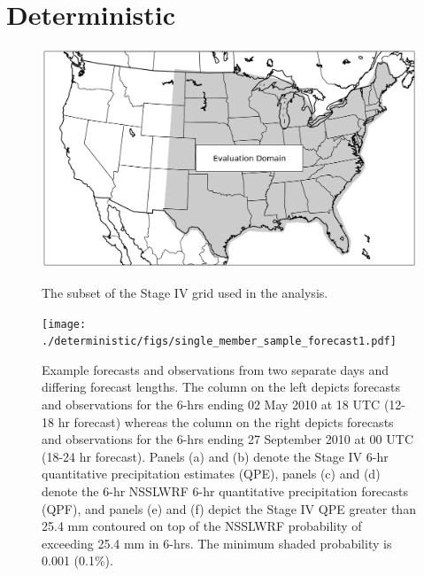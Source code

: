 

\chapter{Deterministic}
\label{deterministic}









\newpage
\begin{figure}[ht]
    \centering
    \includegraphics[width=35pc, angle=0]{./deterministic/figs/domain.pdf}\\
    \caption{The subset of the Stage IV grid used in the analysis.}
    \label{domain}
\end{figure}


\newpage
\begin{figure}[ht]
    \centering
    \texttt{[image: ./deterministic/figs/single\_member\_sample\_forecast1.pdf]}\\
    \caption{Example forecasts and observations from two separate days and differing forecast lengths. The column on the left depicts forecasts and observations for the 6-hrs ending 02 May 2010 at 18 UTC (12-18 hr forecast) whereas the column on the right depicts forecasts and observations for the 6-hrs ending 27 September 2010 at 00 UTC (18-24 hr forecast). Panels (a) and (b) denote the Stage IV 6-hr quantitative precipitation estimates (QPE), panels (c) and (d) denote the 6-hr NSSLWRF 6-hr quantitative precipitation forecasts (QPF), and panels (e) and (f) depict the Stage IV QPE greater than 25.4 mm contoured on top of the NSSLWRF probability of exceeding 25.4 mm in 6-hrs. The minimum shaded probability is 0.001 (0.1\%).}
    \label{single_sample1}
\end{figure}


